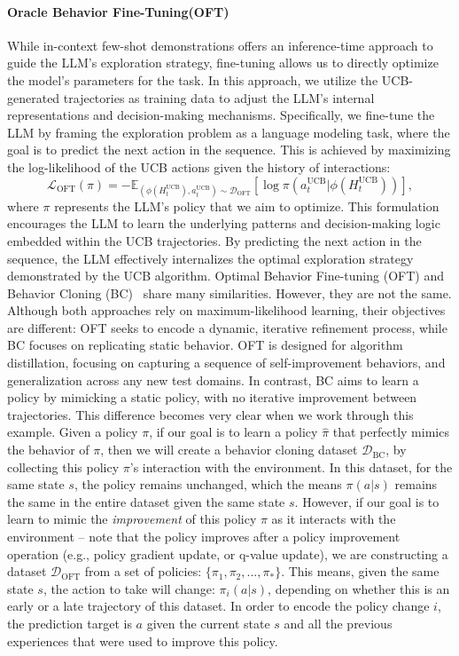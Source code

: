 \documentclass[11pt, logo]{googledeepmind}
\newcommand{\loss}{{\mathcal{L}}}
\newcommand{\data}{\mathcal{D}}
\def\gD{{\mathcal{D}}}
\newcommand{\E}{\mathbb{E}}
\newcommand{\oft}{Oracle Behavior Fine-Tuning\xspace}
\theoremstyle{plain}
\theoremstyle{definition}
\begin{document}
\paragraph{\oft (OFT)}
While in-context few-shot demonstrations offers an inference-time approach to guide the LLM's exploration strategy, fine-tuning allows us to directly optimize the model's parameters for the task. In this approach, we utilize the UCB-generated trajectories as training data to adjust the LLM's internal representations and decision-making mechanisms.
Specifically, we fine-tune the LLM by framing the exploration problem as a language modeling task, where the goal is to predict the next action in the sequence. This is achieved by maximizing the log-likelihood of the UCB actions given the history of interactions:
\begin{equation}
    \loss_{\text{OFT}}(\pi) = -\E_{( \phi(H^{\text{UCB}}_t), a^{\text{UCB}}_t) \sim \data_{\text{OFT}}}
    [
    \log \pi(a^{\text{UCB}}_t|\phi(H^{\text{UCB}}_t))
    ],
\end{equation}
where $\pi$ represents the LLM's policy that we aim to optimize.
This formulation encourages the LLM to learn the underlying patterns and decision-making logic embedded within the UCB trajectories. By predicting the next action in the sequence, the LLM effectively internalizes the optimal exploration strategy demonstrated by the UCB algorithm.
Optimal Behavior Fine-tuning (OFT) and Behavior Cloning (BC)~\citep{pomerleau1991efficient} share many similarities. However, they are not the same. Although both approaches rely on maximum-likelihood learning, their objectives are different: OFT seeks to encode a dynamic, iterative refinement process, while BC focuses on replicating static behavior. OFT is designed for algorithm distillation, focusing on capturing a sequence of self-improvement behaviors, and generalization across any new test domains. In contrast, BC aims to learn a policy by mimicking a static policy, with no iterative improvement between trajectories.
This difference becomes very clear when we work through this example. Given a policy $\pi$, if our goal is to learn a policy $\hat \pi$ that perfectly mimics the behavior of $\pi$, then we will create a behavior cloning dataset $\gD_{\text{BC}}$, by collecting this policy $\pi$'s interaction with the environment. In this dataset, for the same state $s$, the policy remains unchanged, which the means $\pi(a|s)$ remains the same in the entire dataset given the same state $s$. However, if our goal is to learn to mimic the \textit{improvement} of this policy $\pi$ as it interacts with the environment -- note that the policy improves after a policy improvement operation (e.g., policy gradient update, or q-value update), we are constructing a dataset $\gD_{\text{OFT}}$ from a set of policies: $\{\pi_1, \pi_2, ..., \pi_{*}\}$. This means, given the same state $s$, the action to take will change: $\pi_i(a|s)$, depending on whether this is an early or a late trajectory of this dataset. In order to encode the policy change $i$, the prediction target is $a$ given the current state $s$ and all the previous experiences that were used to improve this policy.
\end{document}
